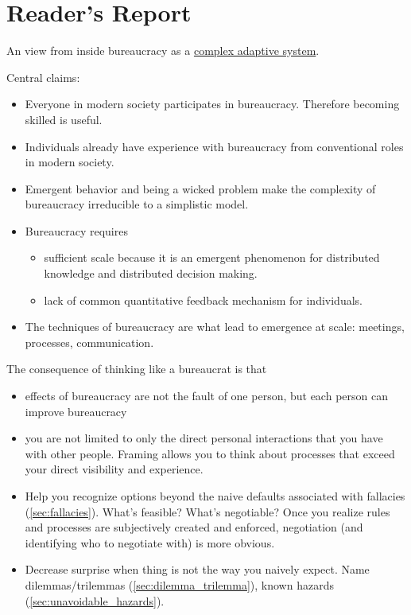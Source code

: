 \section{Reader's Report\label{sec:reader_report}}
An view from inside bureaucracy as a \href{https://en.wikipedia.org/wiki/Complexity_theory_and_organizations}{complex adaptive system}. 

Central claims:
\begin{itemize}
    \item Everyone in modern society participates in bureaucracy. Therefore becoming skilled is useful.
    \item Individuals already have experience with bureaucracy from conventional roles in modern society. 
    \item Emergent behavior and being a wicked problem make the complexity of bureaucracy irreducible to a simplistic model.
    \item Bureaucracy requires 
    \begin{itemize}
        \item sufficient scale because it is an emergent phenomenon for distributed knowledge and distributed decision making. 
        \item lack of common quantitative feedback mechanism for individuals.
    \end{itemize}
    \item The techniques of bureaucracy are what lead to emergence at scale: meetings, processes, communication. 
\end{itemize}
The consequence of thinking like a bureaucrat is that
\begin{itemize}
    \item effects of bureaucracy are not the fault of one person, but each person can improve bureaucracy
    \item you are not limited to only the direct personal interactions that you have with other people. Framing allows you to think about processes that exceed your direct visibility and experience.
    \item Help you recognize options beyond the naive defaults associated with fallacies (\ref{sec:fallacies}). What's feasible? What's negotiable? Once you realize rules and processes are subjectively created and enforced, negotiation (and identifying who to negotiate with) is more obvious.
    \item Decrease surprise when thing is not the way you naively expect. Name dilemmas/trilemmas (\ref{sec:dilemma_trilemma}), known hazards (\ref{sec:unavoidable_hazards}).
\end{itemize}
